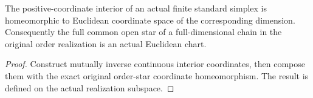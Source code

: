 \begin{proposition}
  \label{prop:actual-full-star-euclidean-charts}
  \leanok
  The positive-coordinate interior of an actual finite standard simplex is homeomorphic to Euclidean coordinate space of the corresponding dimension. Consequently the full common open star of a full-dimensional chain in the original order realization is an actual Euclidean chart.
\end{proposition}
\begin{proof}
  Construct mutually inverse continuous interior coordinates, then compose them with the exact original order-star coordinate homeomorphism. The result is defined on the actual realization subspace.
  \leanok
\end{proof}

